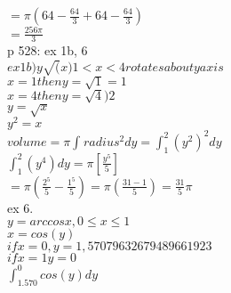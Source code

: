 \documentclass{article}
\begin{document}
  $=\pi(64-\frac{64}{3}+64-\frac{64}{3})$\\
  $=\frac{256\pi}{3}$\\
  p 528: ex 1b, 6\\
  $ex1b) y\sqrt(x) 1<x<4 rotates about yaxis$\\
  $x=1 then y=\sqrt{1}=1$\\
  $x=4 then y=\sqrt{4})2$\\
  $y=\sqrt{x}$\\
  $y^2=x$\\
  $volume=\pi \int_{}^{}radius^2 dy=\int_{1}^{2}(y^2)^2dy$\\
  $\int_{1}^{2}(y^4)dy=\pi[\frac{y^5}{5}]$\\
  $=\pi(\frac{2^5}{5}-\frac{1^5}{5})=\pi(\frac{31-1}{5})=\frac{31}{5}\pi$\\
  ex 6. \\
  $y=arccos x, 0\leq x\leq 1$\\
  $x=cos(y)$\\
  $if x=0, y=1,57079632679489661923$\\
  $if x=1 y=0$\\
  $\int_{1.570}^{0}cos(y)dy$\\

  

   
\end{document}
